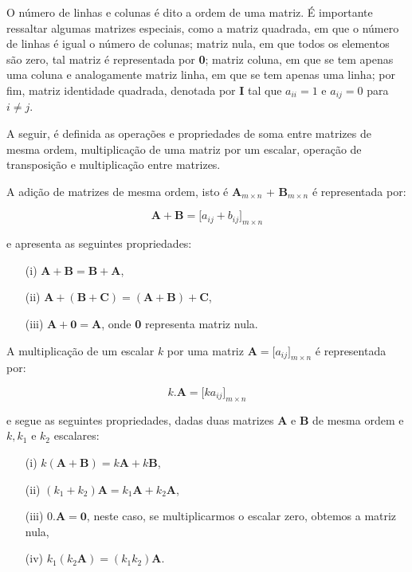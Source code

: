     O número de linhas e colunas é dito a ordem de uma matriz. É importante ressaltar algumas matrizes especiais, como a matriz quadrada, em que o número de linhas é igual o número de colunas; matriz nula, em que todos os elementos são zero, tal matriz é representada por \textbf{0}; matriz coluna, em que se tem apenas uma coluna e analogamente matriz linha, em que se tem apenas uma linha; por fim, matriz identidade quadrada, denotada por \textbf{I} tal que $a_{ii} = 1$ e $a_{ij} = 0$ para $i \neq j$.

    A seguir, é definida as operações e propriedades de soma entre matrizes de mesma ordem, multiplicação de uma matriz por um escalar, operação de transposição e multiplicação entre matrizes.
    
    A adição de matrizes de mesma ordem, isto é $\textbf{A}_{m \times n}$ + $\textbf{B}_{m \times n}$ é representada por:

                        $$\textbf{A} + \textbf{B} = {[}a_{ij} + b_{ij}{]}_{m \times n}$$
                
    \noindent
    e apresenta as seguintes propriedades:
    \begin{itemize}
        \item[(i)] $\textbf{A} + \textbf{B} = \textbf{B} + \textbf{A}$,
        \item[(ii)] $\textbf{A} + (\textbf{B} + \textbf{C}) = (\textbf{A} + \textbf{B}) + \textbf{C}$,
        \item[(iii)] $\textbf{A} + \textbf{0} = \textbf{A}$, onde \textbf{0} representa matriz nula.
    \end{itemize}

    A multiplicação de um escalar $k$ por uma matriz $\textbf{A} = {[}a_{ij}{]}_{m \times n}$ é representada por:

                            $$k.\textbf{A} = {[}k a_{ij}{]}_{m \times n}$$

    \noindent
    e segue as seguintes propriedades, dadas duas matrizes \textbf{A} e \textbf{B} de mesma ordem e $k,k_1$ e $k_2$ escalares:
     \begin{itemize}
        \item[(i)] $k(\textbf{A} + \textbf{B}) = k\textbf{A} + k\textbf{B}$,
        \item[(ii)] $(k_1 + k_2)\textbf{A} = k_1 \textbf{A} + k_2 \textbf{A}$,
        \item[(iii)] $0.\textbf{A} = \textbf{0}$, neste caso, se multiplicarmos o escalar zero, obtemos a matriz nula,
        \item[(iv)] $k_1(k_2 \textbf{A}) = (k_1 k_2)\textbf{A}$.
    \end{itemize}

